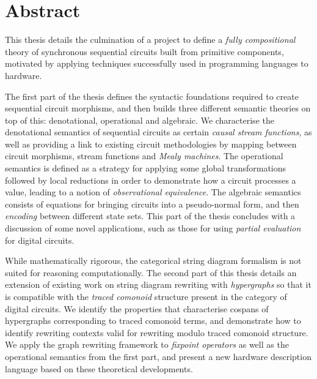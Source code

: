 \chapter{Abstract}

This thesis details the culmination of a project to define a
\emph{fully compositional} theory of synchronous sequential circuits built from
primitive components, motivated by applying techniques successfully used in
programming languages to hardware.

The first part of the thesis defines the syntactic foundations required to
create sequential circuit morphisms, and then builds three different semantic
theories on top of this: denotational, operational and algebraic.
We characterise the denotational semantics of sequential circuits as certain
\emph{causal stream functions}, as well as providing a link to existing circuit
methodologies by mapping between circuit morphisms, stream functions and
\emph{Mealy machines}.
The operational semantics is defined as a strategy for applying some global
transformations followed by local reductions in order to demonstrate how a
circuit processes a value, leading to a notion of
\emph{observational equivalence}.
The algebraic semantics consists of equations for bringing circuits into
a pseudo-normal form, and then \emph{encoding} between different state sets.
This part of the thesis concludes with a discussion of some novel applications,
such as those for using \emph{partial evaluation} for digital circuits.

While mathematically rigorous, the categorical string diagram formalism is not
suited for reasoning computationally.
The second part of this thesis details an extension of existing work on string
diagram rewriting with \emph{hypergraphs} so that it is compatible with the
\emph{traced comonoid} structure present in the category of digital circuits.
We identify the properties that characterise cospans of hypergraphs
corresponding to traced comonoid terms, and demonstrate how to identify
rewriting contexts valid for rewriting modulo traced comonoid structure.
We apply the graph rewriting framework to \emph{fixpoint operators} as well as
the operational semantics from the first part, and present a new hardware
description language based on these theoretical developments.